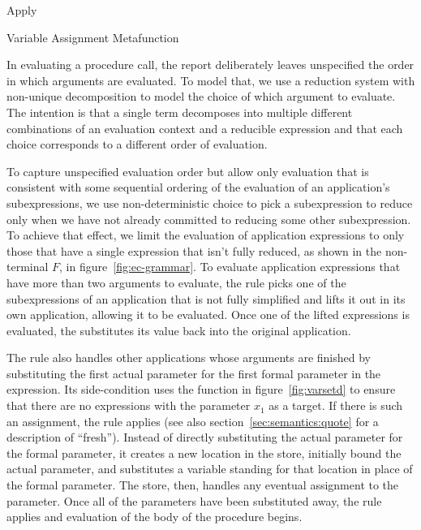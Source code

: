 \beginfig
\begin{center}

\end{center}
\caption{Apply}\label{fig:apply}
\endfig

\beginfig
\begin{center}

\end{center}
\caption{Variable Assignment Metafunction}\label{fig:varsetd}
\endfig

In evaluating a procedure call, the report deliberately leaves
unspecified the order in which arguments are evaluated. To model that,
we use a reduction system with non-unique decomposition to model the
choice of which argument to evaluate. The intention is that a single
term decomposes into multiple different combinations of an evaluation
context and a reducible expression and that each choice corresponds to
a different order of evaluation.

To capture unspecified evaluation order but allow only evaluation that
is consistent with some sequential ordering of the evaluation of an
application's subexpressions, we use non-deterministic choice to pick
a subexpression to reduce only when we have not already committed to
reducing some other subexpression. To achieve that effect, we limit
the evaluation of application expressions to only those that have a
single expression that isn't fully reduced, as shown in the
non-terminal $F$, in figure~\ref{fig:ec-grammar}. To evaluate
application expressions that have more than two arguments to evaluate,
the rule  picks one of the subexpressions of an
application that is not fully simplified and lifts it out in its own
application, allowing it to be evaluated. Once one of the lifted
expressions is evaluated, the  substitutes its value
back into the original application.

The  rule also handles other applications whose
arguments are finished by substituting the first actual parameter for
the first formal parameter in the expression. Its side-condition uses
the function in figure~\ref{fig:varsetd} to ensure that there are no
 expressions with the parameter $x_1$ as a target.
If there is such an assignment, the  rule applies (see also section~\ref{sec:semantics:quote} for a description of ``fresh'').
Instead of directly substituting the actual parameter for the formal
parameter, it creates a new location in the store, initially bound the
actual parameter, and substitutes a variable standing for that
location in place of the formal parameter. The store, then, handles
any eventual assignment to the parameter. Once all of the parameters
have been substituted away, the rule  applies and
evaluation of the body of the procedure begins.

